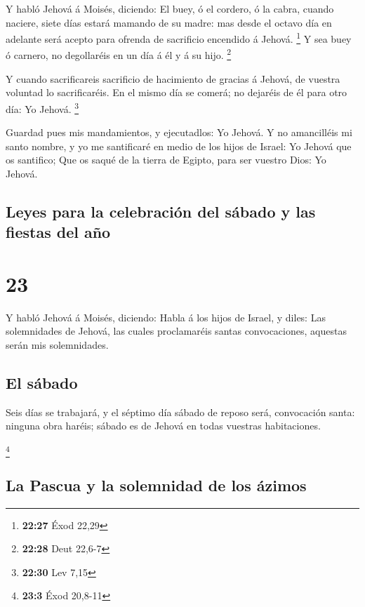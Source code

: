  Y habló Jehová á Moisés, diciendo:  El
buey, ó el cordero, ó la cabra, cuando naciere, siete días estará
mamando de su madre: mas desde el octavo día en adelante será acepto
para ofrenda de sacrificio encendido á Jehová. \footnote{\textbf{22:27}
  Éxod 22,29}  Y sea buey ó carnero, no degollaréis en un
día á él y á su hijo. \footnote{\textbf{22:28} Deut 22,6-7}

 Y cuando sacrificareis sacrificio de hacimiento de
gracias á Jehová, de vuestra voluntad lo sacrificaréis. 
En el mismo día se comerá; no dejaréis de él para otro día: Yo Jehová.
\footnote{\textbf{22:30} Lev 7,15}

 Guardad pues mis mandamientos, y ejecutadlos: Yo Jehová.
 Y no amancilléis mi santo nombre, y yo me santificaré en
medio de los hijos de Israel: Yo Jehová que os santifico;
 Que os saqué de la tierra de Egipto, para ser vuestro
Dios: Yo Jehová.

\hypertarget{leyes-para-la-celebraciuxf3n-del-suxe1bado-y-las-fiestas-del-auxf1o}{%
\subsection{Leyes para la celebración del sábado y las fiestas del
año}\label{leyes-para-la-celebraciuxf3n-del-suxe1bado-y-las-fiestas-del-auxf1o}}

\hypertarget{section-22}{%
\section{23}\label{section-22}}

 Y habló Jehová á Moisés, diciendo:  Habla á
los hijos de Israel, y diles: Las solemnidades de Jehová, las cuales
proclamaréis santas convocaciones, aquestas serán mis solemnidades.

\hypertarget{el-suxe1bado}{%
\subsection{El sábado}\label{el-suxe1bado}}

 Seis días se trabajará, y el séptimo día sábado de reposo
será, convocación santa: ninguna obra haréis; sábado es de Jehová en
todas vuestras habitaciones.

\footnote{\textbf{23:3} Éxod 20,8-11}

\hypertarget{la-pascua-y-la-solemnidad-de-los-uxe1zimos}{%
\subsection{La Pascua y la solemnidad de los
ázimos}\label{la-pascua-y-la-solemnidad-de-los-uxe1zimos}}

